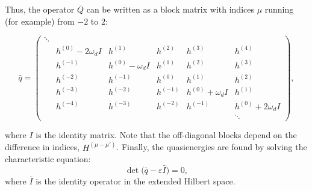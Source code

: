 Thus, the operator $\overline{Q}$ can be written as a block matrix with indices $\mu$ running (for example) from $-2$ to $2$:
\begin{widetext}
\begin{equation}
    \bar{q} = \begin{pmatrix}
    \ddots & & & & & \\
     & h^{(0)}-2\omega_d I & h^{(1)} & h^{(2)}  & h^{(3)} & h^{(4)}  \\
     & h^{(-1)}            & h^{(0)}-\omega_d I & h^{(1)} & h^{(2)} & h^{(3)}  \\
     & h^{(-2)}            & h^{(-1)}  & h^{(0)}    & h^{(1)} & h^{(2)}  \\
     & h^{(-3)}            & h^{(-2)}  & h^{(-1)}   & h^{(0)}+\omega_d I & h^{(1)} \\
     & h^{(-4)}            & h^{(-3)}  & h^{(-2)}   & h^{(-1)} & h^{(0)}+2\omega_d I \\
     & & & & & \ddots
    \end{pmatrix},
\end{equation}
\end{widetext}
where $I$ is the identity matrix. Note that the off-diagonal blocks depend on the difference in indices, $H^{(\mu-\mu')}$. Finally, the quasienergies are found by solving the characteristic equation:
\begin{equation}
    \det\bigl(\bar{q}-\varepsilon \bar{I}\bigr)=0,
\end{equation}
where $\bar{I}$ is the identity operator in the extended Hilbert space.



